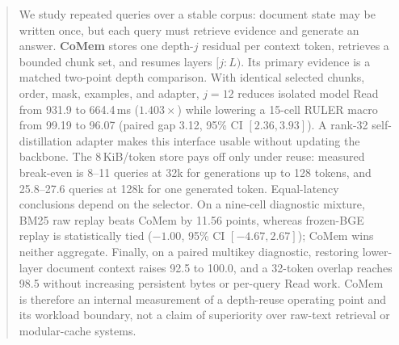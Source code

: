 \begin{abstract}
We study repeated queries over a stable corpus: document state may be written
once, but each query must retrieve evidence and generate an answer.
\textbf{CoMem} stores one depth-$j$ residual per context token, retrieves a
bounded chunk set, and resumes layers $[j{:}L)$. Its primary evidence is a
matched two-point depth comparison. With identical selected chunks, order, mask,
examples, and adapter, $j{=}12$ reduces isolated model Read from 931.9 to
664.4\,ms ($1.403\times$) while lowering a 15-cell RULER macro from 99.19 to
96.07 (paired gap 3.12, 95\% CI $[2.36,3.93]$). A rank-32
self-distillation adapter makes this interface usable without updating the
backbone. The 8\,KiB/token store pays off only under reuse: measured
break-even is 8--11 queries at 32k for generations up to 128 tokens, and
25.8--27.6 queries at 128k for one generated token. Equal-latency conclusions
depend on the selector. On a nine-cell diagnostic mixture, BM25 raw replay
beats CoMem by 11.56 points, whereas frozen-BGE replay is statistically tied
($-1.00$, 95\% CI $[-4.67,2.67]$); CoMem wins neither aggregate. Finally, on a
paired multikey diagnostic, restoring lower-layer document context raises 92.5
to 100.0, and a 32-token overlap reaches 98.5 without increasing persistent
bytes or per-query Read work. CoMem is therefore an internal measurement of a
depth-reuse operating point and its workload boundary, not a claim of
superiority over raw-text retrieval or modular-cache systems.
\end{abstract}
